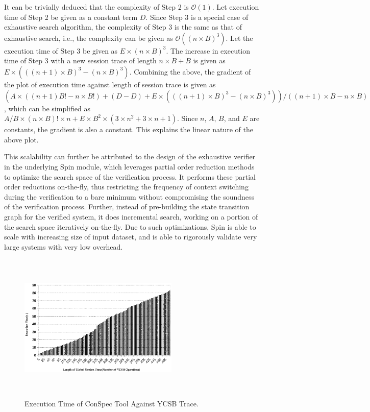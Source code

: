 \documentclass[journal,compsoc]{IEEEtran}
\begin{document}
  It can be trivially deduced that the complexity of Step 2 is $\mathcal{O}(1)$. Let execution time of Step 2 be given as a constant term $D$. Since Step 3 is a special case of exhaustive search algorithm, the complexity of Step 3 is the same as that of exhaustive search, i.e., the complexity can be given as $\mathcal{O}((n \times B)^3)$. Let the execution time of Step 3 be given as $E \times (n \times B)^3$. The  increase in execution time of Step 3 with a new session trace of length $n \times B + B$  is given as $E\times (((n +1) \times B)^3 - (n \times B)^3)$. Combining the above, the gradient of the plot of execution time against length of session trace is given as $(A \times ((n+1)B! - n \times B!) + (D -D) + E\times (((n +1) \times B)^3 - (n \times B)^3)) / ((n+1) \times B -n \times B)$, which can be simplified as $A/B \times (n \times B)! \times n + E \times B^2 \times (3 \times n^2 + 3 \times n + 1)$.   Since $n$, $A$, $B$, and $E$ are constants, the gradient is also a constant. This explains the linear nature of the above plot.  
 \par This scalability can further be attributed to the design of the exhaustive verifier in the underlying Spin module, which leverages partial order reduction methods to optimize the search space of the verification process.  It performs these partial order reductions on-the-fly, thus restricting the frequency of context switching during the verification to a bare minimum without compromising the soundness of the verification process.  Further, instead of pre-building the state transition graph  for the verified system, it does incremental search, working on a portion of the search space iteratively on-the-fly.  
 Due to such optimizations, Spin is able to scale with increasing size of input dataset, and is able to rigorously validate very large systems with very low overhead. 
 \begin{figure}%
        \includegraphics[width=3in,height=2.8in]
                    {conspecExecutionTimesFull.eps} %
        \caption{Execution Time of ConSpec Tool Against YCSB Trace.}
        \label{fig:examplefull}
\end{figure}
\end{document}
